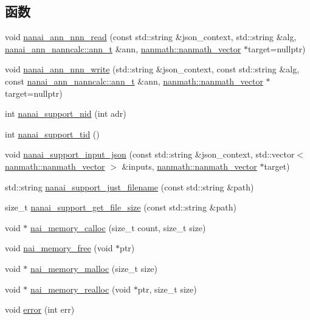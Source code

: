\subsection*{函数}
\begin{DoxyCompactItemize}
\item 
void \hyperlink{namespacenanai_a20e02521fe935d028e8b2d88a313c2a5}{nanai\+\_\+ann\+\_\+nnn\+\_\+read} (const std\+::string \&json\+\_\+context, std\+::string \&alg, \hyperlink{classnanai_1_1nanai__ann__nanncalc_1_1ann__t}{nanai\+\_\+ann\+\_\+nanncalc\+::ann\+\_\+t} \&ann, \hyperlink{classnanmath_1_1nanmath__vector}{nanmath\+::nanmath\+\_\+vector} $\ast$target=nullptr)
\item 
void \hyperlink{namespacenanai_ae4c32003caaa1ec76a3cb62ad31a1357}{nanai\+\_\+ann\+\_\+nnn\+\_\+write} (std\+::string \&json\+\_\+context, const std\+::string \&alg, const \hyperlink{classnanai_1_1nanai__ann__nanncalc_1_1ann__t}{nanai\+\_\+ann\+\_\+nanncalc\+::ann\+\_\+t} \&ann, \hyperlink{classnanmath_1_1nanmath__vector}{nanmath\+::nanmath\+\_\+vector} $\ast$target=nullptr)
\item 
int \hyperlink{namespacenanai_a8955229cdf11e2d23ab55fc290c48149}{nanai\+\_\+support\+\_\+nid} (int adr)
\item 
int \hyperlink{namespacenanai_a8580e60e0a68dee6dcbc37c87bb96c64}{nanai\+\_\+support\+\_\+tid} ()
\item 
void \hyperlink{namespacenanai_a79e141583981fcfd056e2d0840b6f266}{nanai\+\_\+support\+\_\+input\+\_\+json} (const std\+::string \&json\+\_\+context, std\+::vector$<$ \hyperlink{classnanmath_1_1nanmath__vector}{nanmath\+::nanmath\+\_\+vector} $>$ \&inputs, \hyperlink{classnanmath_1_1nanmath__vector}{nanmath\+::nanmath\+\_\+vector} $\ast$target)
\item 
std\+::string \hyperlink{namespacenanai_ac074f99f45eae555eead257e190c0bc8}{nanai\+\_\+support\+\_\+just\+\_\+filename} (const std\+::string \&path)
\item 
size\+\_\+t \hyperlink{namespacenanai_ab80cfceeef0eaa6bdc340551049b08b0}{nanai\+\_\+support\+\_\+get\+\_\+file\+\_\+size} (const std\+::string \&path)
\item 
void $\ast$ \hyperlink{namespacenanai_a6b14a6c7614acd05e543b753f956f014}{nai\+\_\+memory\+\_\+calloc} (size\+\_\+t count, size\+\_\+t size)
\item 
void \hyperlink{namespacenanai_a5a7f4b23abf51a72b48e4b9b1a6bc1ab}{nai\+\_\+memory\+\_\+free} (void $\ast$ptr)
\item 
void $\ast$ \hyperlink{namespacenanai_af06ac34e8be6b06f6187e1339406a93d}{nai\+\_\+memory\+\_\+malloc} (size\+\_\+t size)
\item 
void $\ast$ \hyperlink{namespacenanai_ac8b2a5d411cf6fdafc7483649501d4eb}{nai\+\_\+memory\+\_\+realloc} (void $\ast$ptr, size\+\_\+t size)
\item 
void \hyperlink{namespacenanai_a89261d96bcefbd9b2e87c85a4370f878}{error} (int err)
\end{DoxyCompactItemize}



